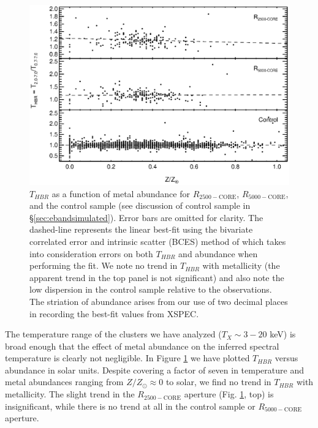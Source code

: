 \begin{figure}
\begin{center}
\includegraphics*[width=\textwidth, trim=0mm 0mm 0mm 0mm, clip]{eband_f6.eps}
\caption[$T_{HBR}$ vs. best-fit metallicity]{$T_{HBR}$ as a function
  of metal abundance for $R_{2500-\mathrm{CORE}}$,
  $R_{5000-\mathrm{CORE}}$, and the control sample (see discussion of
  control sample in \S\ref{sec:ebandsimulated}). Error bars are omitted for
  clarity. The dashed-line represents the linear best-fit using the
  bivariate correlated error and intrinsic scatter (BCES) method of
  \citet{1996ApJ...470..706A} which takes into consideration errors on
  both $T_{HBR}$ and abundance when performing the fit. We note no
  trend in $T_{HBR}$ with metallicity (the apparent trend in the top
  panel is not significant) and also note the low dispersion in the
  control sample relative to the observations. The striation of
  abundance arises from our use of two decimal places in recording the
  best-fit values from {\textsc{XSPEC}}.  }
\label{fig:metal}
\end{center}
\end{figure}

The temperature range of the clusters we have analyzed ($T_X \sim
3-20$ keV) is broad enough that the effect of metal abundance on the
inferred spectral temperature is clearly not negligible. In Figure
\ref{fig:metal} we have plotted $T_{HBR}$ versus abundance in solar
units. Despite covering a factor of seven in temperature and metal
abundances ranging from $Z/Z_{\odot} \approx 0$ to solar, we find no
trend in $T_{HBR}$ with metallicity. The slight trend in the
$R_{2500-\mathrm{CORE}}$ aperture (Fig.  \ref{fig:metal}, top) is
insignificant, while there is no trend at all in the control sample or
$R_{5000-\mathrm{CORE}}$ aperture.

